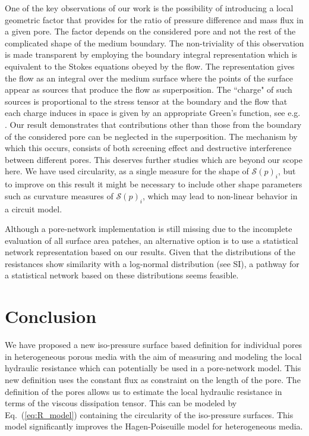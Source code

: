 \documentclass[draft]{agujournal2019}
\begin{document}
One of the key observations of our work is the possibility of introducing a local geometric factor that provides for the ratio of pressure difference and mass flux in a given pore. The factor depends on the considered pore and not the rest of the complicated shape of the medium boundary. The non-triviality of this observation is made transparent by employing the boundary integral representation which is equivalent to the Stokes equations obeyed by the flow. The representation gives the flow as an integral over the medium surface where the points of the surface appear as sources that produce the flow as superposition. The ``charge" of such sources is proportional to the stress tensor at the boundary and the flow that each charge induces in space is given by an appropriate Green's function, see e.g. \cite{pozrikidis_boundary_1992}. Our result demonstrates that contributions other than those from the boundary of the considered pore can be neglected in the superposition. The mechanism by which this occurs, consists of both screening effect and destructive interference between different pores. This deserves further studies which are beyond our scope here. We have used circularity, as a single measure for the shape of $\mathcal{S}(p)_i$, but to improve on this result it might be necessary to include other shape parameters such as curvature measures of $\mathcal{S}(p)_i$, which may lead to non-linear behavior in a circuit model. 

Although a pore-network implementation is still missing due to the incomplete evaluation of all surface area patches, an alternative option is to use a statistical network representation based on our results. Given that the distributions of the resistances show similarity with a log-normal distribution (see SI), a pathway for a statistical network based on these distributions seems feasible. 

\section{Conclusion}
We have proposed a new iso-pressure surface based definition for individual pores in heterogeneous porous media with the aim of measuring and modeling the local hydraulic resistance which can potentially be used in a pore-network model. This new definition uses the constant flux as constraint on the length of the pore. The definition of the pores allows us to estimate the local hydraulic resistance in terms of the viscous dissipation tensor. This can be modeled by Eq.~(\ref{eq:R_model}) containing the circularity of the iso-pressure surfaces. This model significantly improves the Hagen-Poiseuille model for heterogeneous media. 





\end{document}
